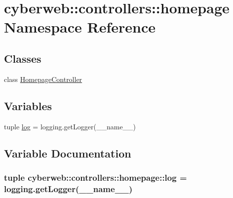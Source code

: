 \hypertarget{namespacecyberweb_1_1controllers_1_1homepage}{\section{cyberweb\-:\-:controllers\-:\-:homepage \-Namespace \-Reference}
\label{namespacecyberweb_1_1controllers_1_1homepage}
}
\subsection*{\-Classes}
\begin{DoxyCompactItemize}
\item 
class \hyperlink{classcyberweb_1_1controllers_1_1homepage_1_1_homepage_controller}{\-Homepage\-Controller}
\end{DoxyCompactItemize}
\subsection*{\-Variables}
\begin{DoxyCompactItemize}
\item 
tuple \hyperlink{namespacecyberweb_1_1controllers_1_1homepage_ae53ded263c9a90ffaccf44aa66651952}{log} = logging.\-get\-Logger(\-\_\-\-\_\-name\-\_\-\-\_\-)
\end{DoxyCompactItemize}


\subsection{\-Variable \-Documentation}
\hypertarget{namespacecyberweb_1_1controllers_1_1homepage_ae53ded263c9a90ffaccf44aa66651952}{
\subsubsection[{log}]{\setlength{\rightskip}{0pt plus 5cm}tuple {\bf cyberweb\-::controllers\-::homepage\-::log} = logging.\-get\-Logger(\-\_\-\-\_\-name\-\_\-\-\_\-)}}\label{namespacecyberweb_1_1controllers_1_1homepage_ae53ded263c9a90ffaccf44aa66651952}
